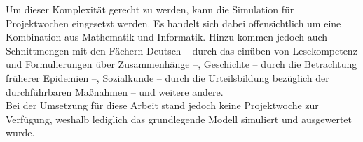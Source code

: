    Um dieser Komplexität gerecht zu werden, kann die Simulation für Projektwochen eingesetzt werden. Es handelt sich dabei offensichtlich um eine Kombination aus Mathematik und Informatik. Hinzu kommen jedoch auch Schnittmengen mit den Fächern Deutsch -- durch das einüben von Lesekompetenz und Formulierungen über Zusammenhänge --, Geschichte -- durch die Betrachtung früherer Epidemien --, Sozialkunde -- durch die Urteilsbildung bezüglich der durchführbaren Maßnahmen -- und weitere andere.\\
   Bei der Umsetzung für diese Arbeit stand jedoch keine Projektwoche zur Verfügung, weshalb lediglich das grundlegende Modell simuliert und ausgewertet wurde.
   

